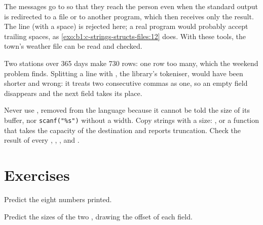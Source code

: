 The messages go to  so that they reach the person even when the standard output is redirected to a file
or to another program, which then receives only the result. The line  (with a space) is rejected here; a
real program would probably accept trailing spaces, as \cref{exo:b1:c-strings-structs-files:12} does. With these
tools, the town's weather file can be read and checked.

\label{lst:b1:c-strings-structs-files:weather}

\label{out:b1:c-strings-structs-files:weather}

Two stations over 365 days make 730 rows: one row too many, which the weekend problem finds. Splitting a line with
, the library's tokeniser, would have been shorter and wrong: it treats two consecutive commas as one, so
an empty field disappears and the next field takes its place.

\begin{safety}
Never use , removed from the language because it cannot be told the size of its buffer, nor \texttt{scanf("\%s")}
without a width. Copy strings with a size: , or a function that takes the capacity of the destination
and reports truncation. Check the result of every , , ,  and
.
\end{safety}

\section{Exercises}\label{sec:b1:c-strings-structs-files:exercises}

\begin{exercise}[$\star$]\label{exo:b1:c-strings-structs-files:1}
Predict the eight numbers printed.
\end{exercise}

\begin{exercise}[$\star$]\label{exo:b1:c-strings-structs-files:2}
Predict the sizes of the two , drawing the offset of each field.
\end{exercise}

